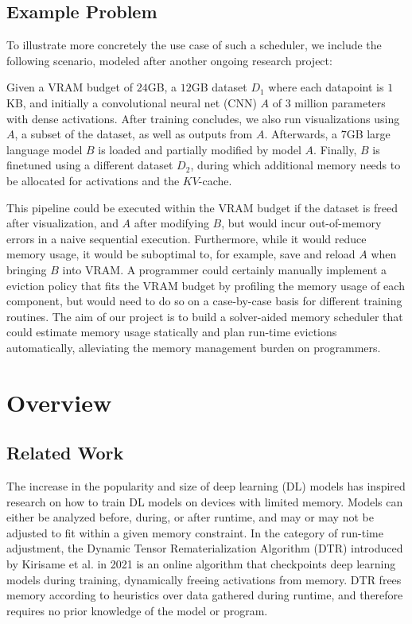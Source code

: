 \documentclass{nfr}
\begin{document}
\subsection{Example Problem}
To illustrate more concretely the use case of such a scheduler, we include the following scenario, modeled after another ongoing research project:
\newline{}


Given a VRAM budget of $24$GB, a $12$GB dataset $D_1$ where each datapoint is $1$KB, and initially a convolutional neural net (CNN) $A$ of $3$ million parameters with dense activations. After training concludes, we also run visualizations using $A$, a subset of the dataset, as well as outputs from $A$. Afterwards, a $7$GB large language model $B$ is loaded and partially modified by model $A$. Finally, $B$ is finetuned using a different dataset $D_2$, during which additional memory needs to be allocated for activations and the $KV$-cache.
\newline


This pipeline could be executed within the VRAM budget if the dataset is freed after visualization, and $A$ after modifying $B$, but would incur out-of-memory errors in a naive sequential execution. Furthermore, while it would reduce memory usage, it would be suboptimal to, for example, save and reload $A$ when bringing $B$ into VRAM. A programmer could certainly manually implement a eviction policy that fits the VRAM budget by profiling the memory usage of each component, but would need to do so on a case-by-case basis for different training routines. The aim of our project is to build a solver-aided memory scheduler that could estimate memory usage statically and plan run-time evictions automatically, alleviating the memory management burden on programmers.

\section{Overview}
\subsection{Related Work}

The increase in the popularity and size of deep learning (DL) models has inspired research on how to train DL models on devices with limited memory. Models can either be analyzed before, during, or after runtime, and may or may not be adjusted to fit within a given memory constraint. In the category of run-time adjustment, the Dynamic Tensor Rematerialization Algorithm (DTR) introduced by Kirisame et al. in 2021 \cite{kirisame2021dynamictensorrematerialization} is an online algorithm that checkpoints deep learning models during training, dynamically freeing activations from memory. DTR frees memory according to heuristics over data gathered during runtime, and therefore requires no prior knowledge of the model or program.
\end{document}
